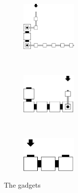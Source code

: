 \begin{figure}[H]
    \begin{subfigure}[t]{0.3\textwidth}
        \centering
        \includegraphics[width=0.3\textwidth]{return_paths/read_next_3_op-or-seed_msr_msd}
        \caption{\label{fig:read_next_3_oporseed_msr_msd}}
    \end{subfigure}%
    ~
    \begin{subfigure}[t]{0.3\textwidth}
        \centering
        \includegraphics[width=0.3\textwidth]{return_paths/read_next_3_seed}
        \caption{\label{fig:read_next_3_seed}}
    \end{subfigure}%
    ~
    \begin{subfigure}[t]{0.3\textwidth}
        \centering
        \includegraphics[width=0.3\textwidth]{return_paths/read_next_2_seed}
        \caption{\label{fig:read_next_2_seed}}
    \end{subfigure}%
    \caption{\label{fig:readnext} The {\readnext} gadgets}
\end{figure}

